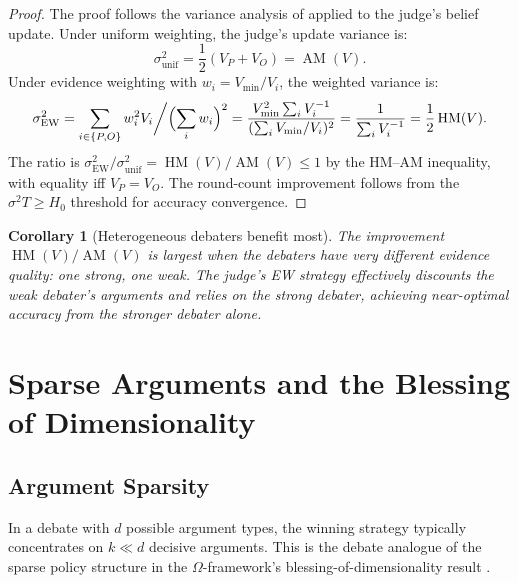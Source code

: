 \documentclass[11pt,a4paper]{article}
\newtheorem{corollary}[theorem]{Corollary}
\DeclareMathOperator{\AM}{AM}
\DeclareMathOperator{\HM}{HM}
\begin{document}
\begin{proof}
The proof follows the variance analysis of \cite{shcherbinin2026ewpg}
applied to the judge's belief update. Under uniform weighting, the
judge's update variance is:
\begin{equation}
    \sigma_{\text{unif}}^2
    = \frac{1}{2}(V_P + V_O)
    = \AM(V).
\end{equation}
Under evidence weighting with $w_i = V_{\min}/V_i$, the weighted
variance is:
\begin{equation}
    \sigma_{\text{EW}}^2
    = \sum_{i \in \{P,O\}} w_i^2 V_i \bigg/ \Bigl(\sum_i w_i\Bigr)^2
    = \frac{V_{\min}^2 \sum_i V_i^{-1}}{(\sum_i V_{\min}/V_i)^2}
    = \frac{1}{\sum_i V_i^{-1}}
    = \frac{1}{2}\HM(V).
\end{equation}
The ratio is $\sigma_{\text{EW}}^2/\sigma_{\text{unif}}^2 = \HM(V)/\AM(V) \leq 1$
by the HM--AM inequality, with equality iff $V_P = V_O$.
The round-count improvement follows from the $\sigma^2 T \geq H_0$
threshold for accuracy convergence.
\end{proof}

\begin{corollary}[Heterogeneous debaters benefit most]
\label{cor:heterogeneous}
The improvement $\HM(V)/\AM(V)$ is largest when the debaters have very
different evidence quality: one strong, one weak. The judge's EW strategy
effectively discounts the weak debater's arguments and relies on the
strong debater, achieving near-optimal accuracy from the stronger debater
alone.
\end{corollary}


\section{Sparse Arguments and the Blessing of Dimensionality}
\label{sec:sparse}

\subsection{Argument Sparsity}

In a debate with $d$ possible argument types, the winning strategy
typically concentrates on $k \ll d$ decisive arguments. This is the
debate analogue of the sparse policy structure in the
$\Omega$-framework's blessing-of-dimensionality result
\cite{shcherbinin2026bless}.
\end{document}
